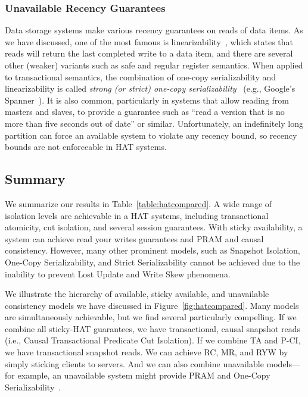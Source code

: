 \subsubsection{Unavailable Recency Guarantees}

Data storage systems make various recency guarantees on reads of data
items. As we have discussed, one of the most famous is
linearizability~\cite{herlihy-art}, which states that reads will
return the last completed write to a data item, and there are several
other (weaker) variants such as safe and regular register
semantics. When applied to transactional semantics, the combination of
one-copy serializability and linearizability is called \textit{strong
  (or strict) one-copy serializability}~\cite{adya} (e.g., Google's
Spanner~\cite{spanner}). It is also common, particularly in systems
that allow reading from masters and slaves, to provide a guarantee
such as ``read a version that is no more than five seconds out of
date'' or similar. Unfortunately, an indefinitely long partition can
force an available system to violate any recency bound, so recency
bounds are not enforceable in HAT systems.

\subsection{Summary}
\label{sec:hat-summary}

We summarize our results in Table~\ref{table:hatcompared}. A wide
range of isolation levels are achievable in a HAT systems, including
transactional atomicity, cut isolation, and several session
guarantees. With sticky availability, a system can achieve read your
writes guarantees and PRAM and causal consistency. However, many other
prominent models, such as Snapshot Isolation, One-Copy
Serializability, and Strict Serializability cannot be achieved due to
the inability to prevent Lost Update and Write Skew phenomena.

We illustrate the hierarchy of available, sticky available, and
unavailable consistency models we have discussed in
Figure~\ref{fig:hatcompared}. Many models are simultaneously
achievable, but we find several particularly compelling. If we combine
all sticky-HAT guarantees, we have transactional, causal snapshot
reads (i.e., Causal Transactional Predicate Cut Isolation). If we
combine TA and P-CI, we have transactional snapshot reads. We can
achieve RC, MR, and RYW by simply sticking clients to servers. And we
can also combine unavailable models---for example, an unavailable
system might provide PRAM and One-Copy
Serializability~\cite{daudjee-session}.

